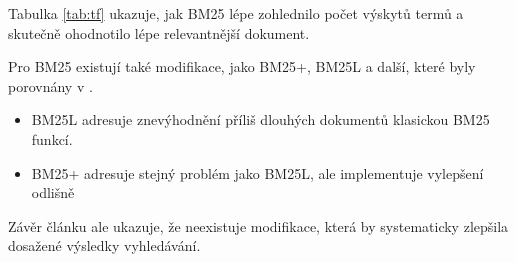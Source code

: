 Tabulka \ref{tab:tf} ukazuje, jak BM25 lépe zohlednilo počet výskytů termů a skutečně ohodnotilo lépe relevantnější dokument.\par \medskip
Pro BM25 existují také modifikace, jako BM25+, BM25L a další, které byly porovnány v \cite{bm25_improvements}.\par
\begin{itemize}
    \item BM25L \cite{bm25_too_long} adresuje znevýhodnění příliš dlouhých dokumentů klasickou BM25 funkcí.
    \item BM25+ \cite{bm25_plus} adresuje stejný problém jako BM25L, ale implementuje vylepšení odlišně
\end{itemize}
Závěr článku \cite{bm25_improvements} ale ukazuje, že neexistuje modifikace, která by systematicky zlepšila dosažené výsledky vyhledávání.\par



